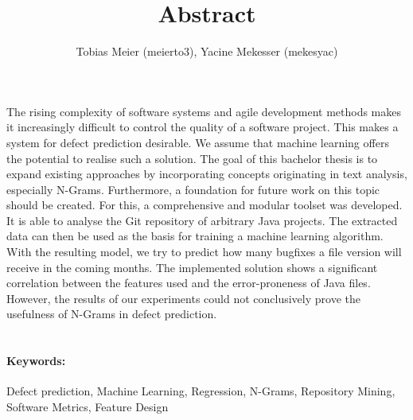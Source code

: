 \documentclass[10pt,a4paper,oneside]{article}
\author{Tobias Meier (meierto3), Yacine Mekesser (mekesyac)}
\title{\large{Abstract}}
\begin{document}
	
	\makeatletter
	\renewcommand{\maketitle}{\bgroup\setlength{\parindent}{0pt}
		\begin{flushleft}
			\textbf{\@title}
		\end{flushleft}\egroup
	}
	\makeatother
	\thispagestyle{empty}
	
	\maketitle
	The rising complexity of software systems and agile development methods makes it increasingly difficult to control the quality of a software project. This makes a system for defect prediction desirable.
	We assume that machine learning offers the potential to realise  such a solution. The goal of this bachelor thesis is to expand existing approaches by incorporating concepts originating in text analysis, especially N-Grams. Furthermore, a foundation for future work on this topic should be created.
	For this, a comprehensive and modular toolset was developed. It is able to analyse the Git repository of arbitrary Java projects. The extracted data can then be used as the basis for training a machine learning algorithm. With the resulting model, we try to predict how many bugfixes a file version will receive in the coming months.
	The implemented solution shows a significant correlation between the features used and the error-proneness of Java files. However, the results of our experiments could not conclusively prove the usefulness of N-Grams in defect prediction.  	
	\\
	\\
	\paragraph{Keywords:} Defect prediction, Machine Learning, Regression, N-Grams, Repository Mining, Software Metrics, Feature Design
\end{document}
